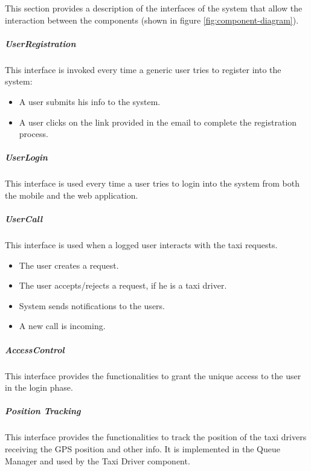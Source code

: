This section provides a description of the interfaces of the system that allow the interaction between the components (shown in figure \ref{fig:component-diagram}).

\subparagraph{UserRegistration}
This interface is invoked every time a generic user tries to register into the system:
\begin{itemize}
    \item A user submits his info to the system.
    \item A user clicks on the link provided in the email to complete the registration process.
\end{itemize}

\subparagraph{UserLogin}
This interface is used every time a user tries to login into the system from both the mobile and the web application.

\subparagraph{UserCall}
This interface is used when a logged user interacts with the taxi requests.
\begin{itemize}
    \item The user creates a request.
    \item The user accepts/rejects a request, if he is a taxi driver.
    \item System sends notifications to the users.
    \item A new call is incoming.
\end{itemize}

\subparagraph{AccessControl}
This interface provides the functionalities to grant the unique access to the user in the login phase.

\subparagraph{Position Tracking}
This interface provides the functionalities to track the position of the taxi drivers receiving the GPS position and other info. It is implemented in the Queue Manager and used by the Taxi Driver component.